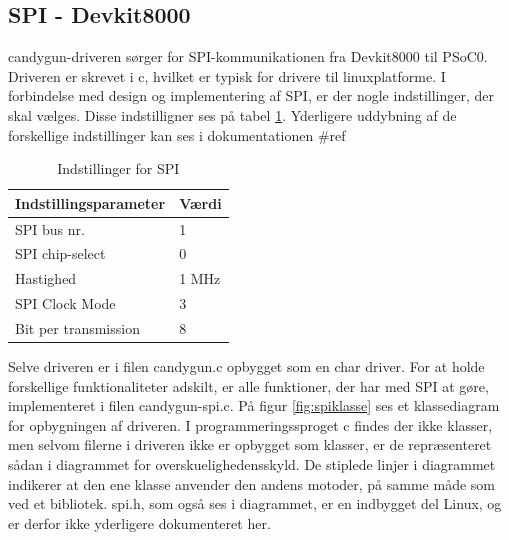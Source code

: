 \subsection{SPI - Devkit8000}
candygun-driveren sørger for SPI-kommunikationen fra Devkit8000 til PSoC0. Driveren er skrevet i c, hvilket er typisk for drivere til linuxplatforme. I forbindelse med design og implementering af SPI, er der nogle indstillinger, der skal vælges. Disse indstilligner ses på tabel \ref{SPItabel}. Yderligere uddybning af de forskellige indstillinger kan ses i dokumentationen \#ref 

\begin{table}[H]
	\centering
	\caption{Indstillinger for SPI}
	\label{SPItabel}
	\begin{tabular}{|l|l|}
		\hline
		\textbf{Indstillingsparameter} & \textbf{Værdi} \\ \hline
		SPI bus nr.                    & 1              \\ \hline
		SPI chip-select                & 0              \\ \hline
		Hastighed                      & 1 MHz          \\ \hline
		SPI Clock Mode                 & 3              \\ \hline
		Bit per transmission           & 8              \\ \hline
	\end{tabular}
\end{table}


Selve driveren er i filen candygun.c opbygget som en char driver. For at holde forskellige funktionaliteter adskilt, er alle funktioner, der har med SPI at gøre, implementeret i filen candygun-spi.c.  På figur \ref{fig:spiklasse} ses et klassediagram for opbygningen af driveren. I programmeringssproget c findes der ikke klasser, men selvom filerne i driveren ikke er opbygget som klasser, er de repræsenteret sådan i diagrammet for overskuelighedensskyld. De stiplede linjer i diagrammet indikerer at den ene klasse anvender den andens motoder, på samme måde som ved et bibliotek. spi.h, som også ses i diagrammet, er en indbygget del Linux, og er derfor ikke yderligere dokumenteret her. 

